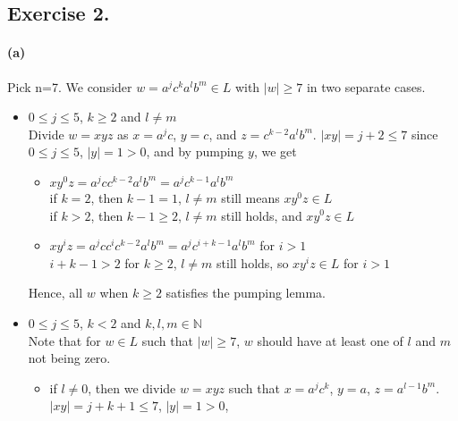 \documentclass[12pt]{article}
\begin{document}
\subsection*{Exercise 2.} 
\paragraph*{(a)} Pick n=7. We consider \(w=a^jc^ka^lb^m \in L\) with \(|w| \geq 7\) in two separate cases.
\begin{itemize}
  \item \(0 \leq j \leq 5\), \(k \geq 2\) and \(l \neq m\)\\
  Divide \(w = xyz\) as \(x = a^jc\), \(y=c\), and \(z=c^{k-2}a^lb^m\). \(|xy| = j+2 \leq 7\) since \(0 \leq j \leq 5\), \(|y| = 1 > 0\), and by pumping \(y\), we get
  \begin{itemize}
    \item \(xy^0z = a^jcc^{k-2}a^lb^m = a^jc^{k-1}a^lb^m\)\\
    if \(k = 2\), then \(k-1 = 1\), \(l \neq m\) still means \(xy^0z \in L\)\\
    if \(k > 2\), then \(k-1 \geq 2\), \(l \neq m\) still holds, and \(xy^0z \in L\)
    \item \(xy^iz = a^jcc^ic^{k-2}a^lb^m = a^jc^{i+k-1}a^lb^m\) for \(i > 1\)\\
    \(i+k-1 > 2\) for \(k \geq 2\), \(l \neq m\) still holds, so \(xy^iz \in L\) for \(i > 1\)
  \end{itemize}
  Hence, all \(w\) when \(k \geq 2\) satisfies the pumping lemma.
  \item \(0 \leq j \leq 5\), \(k < 2\) and \(k, l, m \in \mathbb{N}\)\\
  Note that for \(w \in L\) such that \(|w| \geq 7\), \(w\) should have at least one of \(l\) and \(m\) not being zero.
  \begin{itemize}
    \item if \(l \neq 0\), then we divide \(w = xyz\) such that \(x=a^jc^k\), \(y=a\), \(z=a^{l-1}b^m\). \(|xy|= j+k+1 \leq 7\), \(|y| = 1>0\), 
  
  \end{itemize}
\end{itemize}
\end{document}
